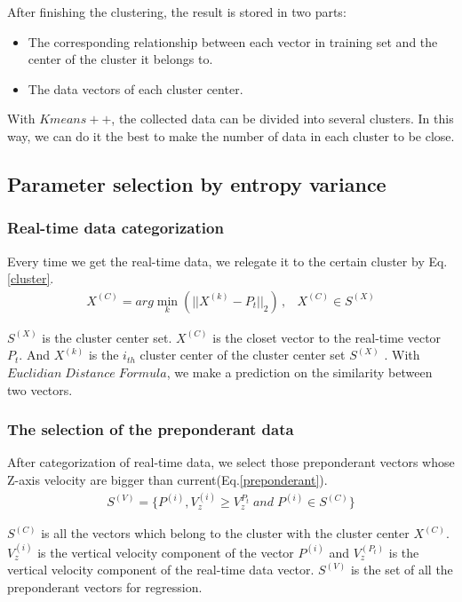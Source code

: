 After finishing the clustering, the result is stored in two parts:

\begin{itemize}
	\item The corresponding relationship between each vector in training set and the center of the cluster it belongs to.
	\item The data vectors of each cluster center.
\end{itemize}

With $Kmeans++$, the collected data can be divided into several clusters. In this way, we can do it the best to make the number of data in each cluster to be close.

\subsection{Parameter selection by entropy variance}

\subsubsection{Real-time data categorization}

Every time we get the real-time data, we relegate it to the certain cluster by Eq.\ref{cluster}.
\begin{eqnarray}\label{cluster}
X^{(C)}=arg\min \limits_{k}{(||X^{(k)}-P_{t}||_{2})} \, ,&X^{(C)}\in S^{(X)}
\end{eqnarray}

$S^{(X)}$ is the cluster center set. $X^{(C)}$ is the closet vector to the real-time vector $P_t$. And $X^{(k)}$ is the $i_{th}$ cluster center of the cluster center set $S^{(X)}$ . With $Euclidian \; Distance \; Formula$, we make a prediction on the similarity between two vectors.

\subsubsection{The selection of the preponderant data}

After categorization of real-time data, we select those preponderant vectors whose Z-axis velocity are bigger than current(Eq.\ref{preponderant}).
\begin{eqnarray}\label{preponderant}
S^{(V)}=\{P^{(i)},V_{z}^{(i)}\geq V_{z}^{P_{t}} \; and \; P^{(i)}\in S^{(C)}\}
\end{eqnarray}

$S^{(C)}$ is all the vectors which belong to the cluster with the cluster center $X^{(C)}$. $V_{z}^{(i)}$ is the vertical velocity component of the vector $P^{(i)}$ and $V_{z}^{(P_{t})}$ is the vertical velocity component of the real-time data vector. $S^{(V)}$ is the set of all the preponderant vectors for regression.

